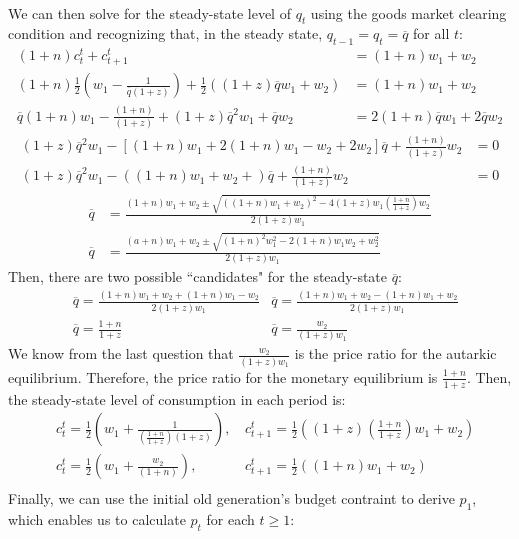 \documentclass{article}
\newcommand{\olq}{\overline{q}}
\begin{document}
\begin{enumerate}
\begin{align*}
		\end{align*}
		We can then solve for the steady-state level of $q_t$ using the goods market clearing condition and recognizing that, in the steady state, $q_{t-1}=q_t=\overline{q}$ for all $t$:
		\begin{align*}
			(1+n)c_t^t + c_{t+1}^t &= (1+n)w_1 + w_2	\\
			(1+n)\frac{1}{2}\left(w_1 - \frac{1}{\olq(1+z)}\right) + \frac{1}{2}\left((1+z)\olq w_1 + w_2\right) &= (1+n)w_1 + w_2 \\
			\olq(1+n)w_1 - \frac{(1+n)}{(1+z)} + (1+z)\olq^2 w_1 + \olq w_2 &= 2(1+n)\olq w_1 + 2\olq w_2 
		\end{align*}
		\begin{align*}
			(1+z)\olq^2 w_1 - \left[(1+n)w_1 + 2(1+n) w_1 - w_2 + 2w_2 \right]\olq + \frac{(1+n)}{(1+z)}w_2  &= 0  \\
			(1+z)\olq^2 w_1 - \left((1+n)w_1 + w_2 + \right)\olq + \frac{(1+n)}{(1+z)}w_2  &= 0  
		\end{align*}
		\begin{align*}
			\olq &= \frac{(1+n)w_1+w_2\pm \sqrt{((1+n)w_1 + w_2)^2 - 4(1+z)w_1\left(\frac{1+n}{1+z}\right)w_2}}{2(1+z)w_1}	\\
			\olq &= \frac{(a+n)w_1+w_2\pm\sqrt{(1+n)^2w_1^2-2(1+n)w_1w_2+w_2^2}}{2(1+z)w_1}
		\end{align*}
		Then, there are two possible ``candidates" for the steady-state $\olq$:
		\begin{align*}
			&\olq = \frac{(1+n)w_1+w_2+(1+n)w_1-w_2}{2(1+z)w_1}	&\olq = \frac{(1+n)w_1+w_2-(1+n)w_1+w_2}{2(1+z)w_1}	\\
			&\olq = \frac{1+n}{1+z}								&\olq = \frac{w_2}{(1+z)w_1}
		\end{align*}
		We know from the last question that $\frac{w_2}{(1+z)w_1}$ is the price ratio for the autarkic equilibrium. Therefore, the price ratio for the monetary equilibrium is $\frac{1+n}{1+z}$. Then, the steady-state level of consumption in each period is:
		\begin{align*}
			&c_t^t 		= \frac{1}{2}\left(w_1 + \frac{1}{\left(\frac{1+n}{1+z}\right)(1+z)}\right)\text{, }	& c_{t+1}^t = \frac{1}{2}\left((1+z)\left(\frac{1+n}{1+z}\right)w_1 + w_2\right) \\
			&c_t^t 		= \frac{1}{2}\left(w_1 + \frac{w_2}{(1+n)}\right)\text{, }	& c_{t+1}^t = \frac{1}{2}\left((1+n)w_1 + w_2\right) \\
		\end{align*}
		Finally, we can use the initial old generation's budget contraint to derive $p_1$, which enables us to calculate $p_t$ for each $t\geq 1$:

\end{enumerate}
\end{document}
